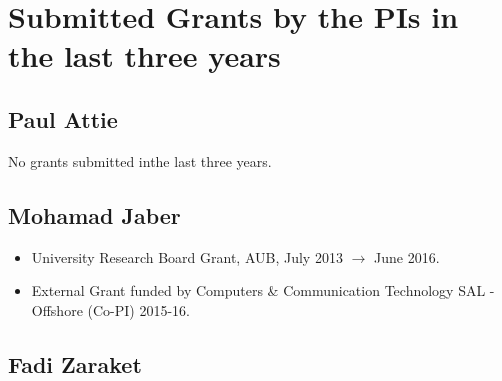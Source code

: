 \section{Submitted Grants by the PIs in the last three years}

\subsection{Paul Attie}

No grants submitted inthe last three years.



\subsection{Mohamad Jaber}
\begin{itemize}
\item{University Research Board Grant, AUB, July 2013 $\rightarrow$ June 2016.}
\item{External Grant funded by Computers \& Communication Technology SAL - Offshore (Co-PI) 2015-16.}
\end{itemize}




\subsection{Fadi Zaraket}



\begin{itemize}


\end{itemize}

